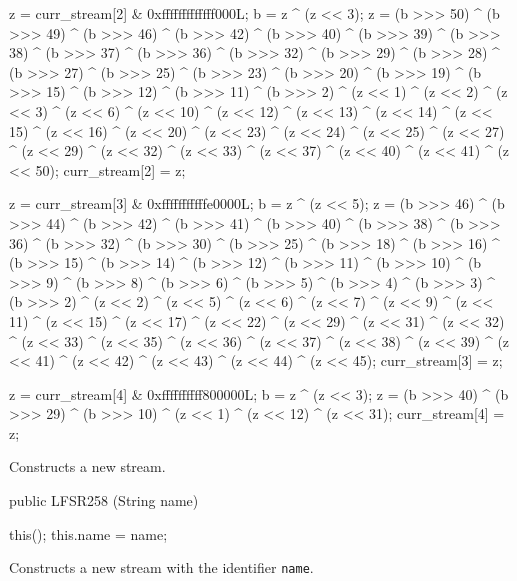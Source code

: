 \begin{code}
\begin{hide}
{        z = curr_stream[2] & 0xfffffffffffff000L;
        b = z ^ (z << 3);
        z = (b >>> 50) ^ (b >>> 49) ^ (b >>> 46) ^ (b >>> 42) ^ (b >>> 40) ^
            (b >>> 39) ^ (b >>> 38) ^ (b >>> 37) ^ (b >>> 36) ^ (b >>> 32) ^
            (b >>> 29) ^ (b >>> 28) ^ (b >>> 27) ^ (b >>> 25) ^ (b >>> 23) ^
            (b >>> 20) ^ (b >>> 19) ^ (b >>> 15) ^ (b >>> 12) ^ (b >>> 11) ^
            (b >>> 2) ^ (z << 1) ^ (z << 2) ^ (z << 3) ^ (z << 6) ^ (z << 10) ^
            (z << 12) ^ (z << 13) ^ (z << 14) ^ (z << 15) ^ (z << 16) ^
            (z << 20) ^ (z << 23) ^ (z << 24) ^ (z << 25) ^ (z << 27) ^
            (z << 29) ^ (z << 32) ^ (z << 33) ^ (z << 37) ^ (z << 40) ^
            (z << 41) ^ (z << 50);
        curr_stream[2] = z;


        z = curr_stream[3] & 0xfffffffffffe0000L;
        b = z ^ (z << 5);
        z = (b >>> 46) ^ (b >>> 44) ^ (b >>> 42) ^ (b >>> 41) ^ (b >>> 40) ^
            (b >>> 38) ^ (b >>> 36) ^ (b >>> 32) ^ (b >>> 30) ^ (b >>> 25) ^
            (b >>> 18) ^ (b >>> 16) ^ (b >>> 15) ^ (b >>> 14) ^ (b >>> 12) ^
            (b >>> 11) ^ (b >>> 10) ^ (b >>> 9) ^ (b >>> 8) ^ (b >>> 6) ^
            (b >>> 5) ^ (b >>> 4) ^ (b >>> 3) ^ (b >>> 2) ^ (z << 2) ^
            (z << 5) ^ (z << 6) ^ (z << 7) ^ (z << 9) ^ (z << 11) ^ (z << 15) ^
            (z << 17) ^ (z << 22) ^ (z << 29) ^ (z << 31) ^ (z << 32) ^
            (z << 33) ^ (z << 35) ^ (z << 36) ^ (z << 37) ^ (z << 38) ^
            (z << 39) ^ (z << 41) ^ (z << 42) ^ (z << 43) ^ (z << 44) ^
            (z << 45);
        curr_stream[3] = z;


        z = curr_stream[4] & 0xffffffffff800000L;
        b = z ^ (z << 3);
        z = (b >>> 40) ^ (b >>> 29) ^ (b >>> 10) ^ (z << 1) ^ (z << 12) ^
            (z << 31);
        curr_stream[4] = z;

    }\end{hide}
\end{code}
\begin{tabb} Constructs a new stream.
\end{tabb}
\begin{code}

    public LFSR258 (String name) \begin{hide} {
        this();
        this.name = name;
    }\end{hide}
\end{code}
\begin{tabb} Constructs a new stream with the identifier \texttt{name}.
\end{tabb}
\begin{htmlonly}
\end{htmlonly}




